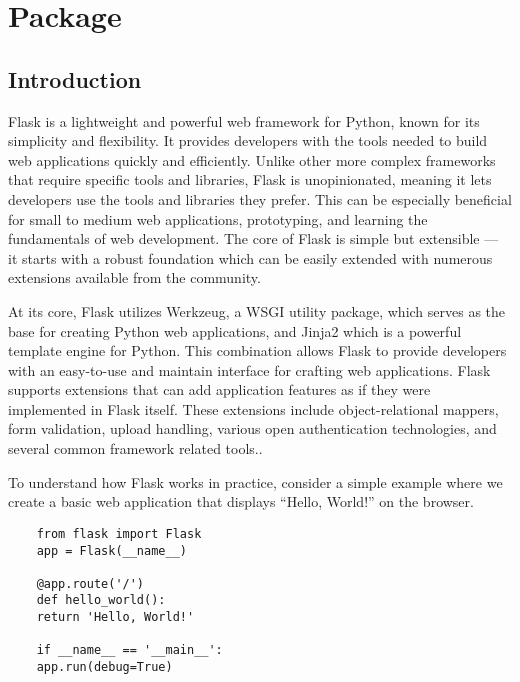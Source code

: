 %
%


\chapter{Package }

\section{Introduction}

Flask is a lightweight and powerful web framework for Python, known for its simplicity and flexibility. It provides developers with the tools needed to build web applications quickly and efficiently. Unlike other more complex frameworks that require specific tools and libraries, Flask is unopinionated, meaning it lets developers use the tools and libraries they prefer. This can be especially beneficial for small to medium web applications, prototyping, and learning the fundamentals of web development. The core of Flask is simple but extensible — it starts with a robust foundation which can be easily extended with numerous extensions available from the community.

At its core, Flask utilizes Werkzeug, a WSGI utility package, which serves as the base for creating Python web applications, and Jinja2 which is a powerful template engine for Python. This combination allows Flask to provide developers with an easy-to-use and maintain interface for crafting web applications. Flask supports extensions that can add application features as if they were implemented in Flask itself. These extensions include object-relational mappers, form validation, upload handling, various open authentication technologies, and several common framework related tools.\cite{Flaskdocs:2024}.

To understand how Flask works in practice, consider a simple example where we create a basic web application that displays ``Hello, World!'' on the browser. 


\lstset{language=Python}

\begin{lstlisting}
	from flask import Flask
	app = Flask(__name__)
	
	@app.route('/')
	def hello_world():
	return 'Hello, World!'
	
	if __name__ == '__main__':
	app.run(debug=True)
\end{lstlisting}


